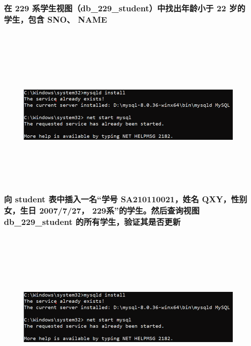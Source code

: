 \documentclass{ctexart}
\begin{document}
\subsubsection{在 229 系学生视图（db\_229\_student）中找出年龄小于 22 岁的学生，包含 SNO、 NAME}
\begin{lstlisting}[language=sql]
	
\end{lstlisting}
\begin{figure}[H]
	\centering 
	\includegraphics[height=7cm,width=14cm]{1.png}
	\end{figure}
\subsubsection{向 student 表中插入一名“学号 SA210110021，姓名 QXY，性别女，生日 2007/7/27， 229系”的学生。然后查询视图 db\_229\_student 的所有学生，验证其是否更新}
\begin{lstlisting}[language=sql]
	
\end{lstlisting}
\begin{figure}[H]
	\centering 
	\includegraphics[height=7cm,width=14cm]{1.png}
	\end{figure}
\end{document}
